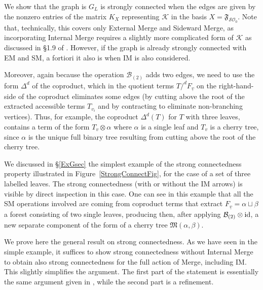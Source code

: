\documentclass[12pt]{amsart}
\numberwithin{equation}{section}
\def\cB{{\mathcal B}}
\def\cK{{\mathcal K}}
\def\cO{{\mathcal O}}
\def\cS{{\mathcal S}}
\def\fM{{\mathfrak M}}
\def\fF{{\mathfrak F}}
\begin{document}
We show that the graph is $G_L$ is strongly connected when the edges are given by the
nonzero entries of the matrix $K_X$ representing $\cK$ in the basis $X=\fF_{\cS\cO_0}$.
Note that, technically, this covers only External Merge and Sideward Merge, as incorporating 
Internal Merge requires a slightly more complicated form of $\cK$ as discussed in 
\S 1.9 of \cite{MCB}. However, if the graph is already strongly connected with EM and SM,
a fortiori it also is when IM is also considered.

Moreover, again because the operation $\cB_{(2)}$ adds two edges, we need to use
the form $\Delta^d$ of the coproduct, which in the quotient terms $T/^d F_{\underline{v}}$ on the
right-hand-side of the coproduct eliminates some edges (by cutting above the root
of the extracted accessible terms $T_{v_i}$ and by contracting to eliminate non-branching vertices). 
Thus, for example, the coproduct $\Delta^d(T)$ for $T$ with three leaves, contains a term of the form
$T_v \otimes \alpha$ where $\alpha$ is a single leaf and $T_v$ is a cherry tree, since $\alpha$ is the unique
full binary tree resulting from cutting above the root of the cherry tree.  

We discussed in \S \ref{ExGsec} the simplest example of the strong connectedness property illustrated in 
Figure~\ref{StrongConnectFig}, for the case of a set of three labelled leaves.  The strong
connectedness (with or without the IM arrows) is visible by direct inspection in this case.
One can see in this example that all the SM operations involved are coming from
coproduct terms that extract $F_{\underline{v}}=\alpha \sqcup \beta$ a forest consisting of
two single leaves, producing then, after applying $\cB_{(2)}\otimes {\rm id}$, a new separate
component of the form of a cherry tree $\fM(\alpha, \beta)$. 

We prove here the general result on strong connectedness. 
As we have seen in the simple example, it suffices
to show strong connectedness without Internal Merge to obtain also strong connectedness
for the full action of Merge, including IM. This slightly simplifies the argument. 
The first part of the statement is essentially the same argument given in \cite{MCB}, while
the second part is a refinement. 
\end{document}
